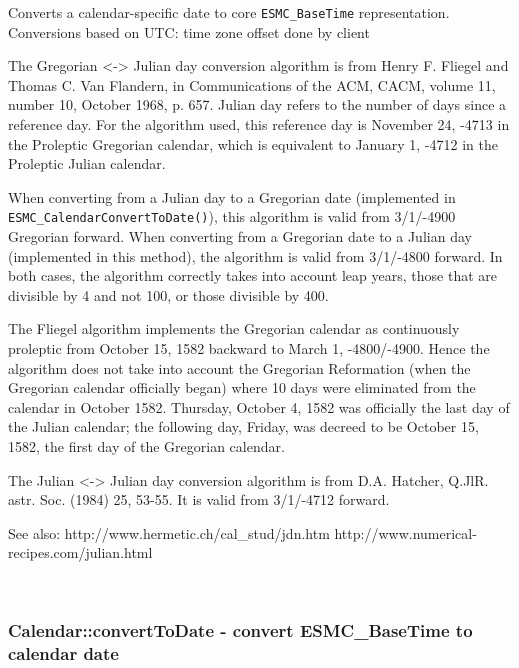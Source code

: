        Converts a calendar-specific date to core {\tt ESMC\_BaseTime}
       representation. Conversions based on UTC: time zone offset done by
       client
  
       The Gregorian <-> Julian day conversion algorithm is from
       Henry F. Fliegel and Thomas C. Van Flandern, in Communications of
       the ACM, CACM, volume 11, number 10, October 1968, p. 657.
       Julian day refers to the number of days since a reference day.
       For the algorithm used, this reference day is November 24, -4713
       in the Proleptic Gregorian calendar, which is equivalent to
       January 1, -4712 in the Proleptic Julian calendar.
   
       When converting from a Julian day to a Gregorian date (implemented
       in {\tt ESMC\_CalendarConvertToDate()}), this algorithm is valid from
       3/1/-4900 Gregorian forward.  When converting from a Gregorian date to
       a Julian day (implemented in this method), the algorithm is valid from
       3/1/-4800 forward.  In both cases, the algorithm correctly takes into
       account leap years, those that are divisible by 4 and not 100, or those
       divisible by 400.
  
       The Fliegel algorithm implements the Gregorian calendar as continuously
       proleptic from October 15, 1582 backward to March 1, -4800/-4900.
       Hence the algorithm does not take into account the Gregorian Reformation
       (when the Gregorian calendar officially began) where 10 days were
       eliminated from the calendar in October 1582.  Thursday, October 4, 1582
       was officially the last day of the Julian calendar; the following day,
       Friday, was decreed to be October 15, 1582, the first day of the
       Gregorian calendar.
  
       The Julian <-> Julian day conversion algorithm is from D.A. Hatcher,
       Q.JlR. astr. Soc. (1984) 25, 53-55.  It is valid from 3/1/-4712 forward.
  
       See also:  http://www.hermetic.ch/cal\_stud/jdn.htm
                  http://www.numerical-recipes.com/julian.html
   
 
\mbox{}\hrulefill\ 
 
\subsubsection [Calendar::convertToDate] {Calendar::convertToDate - convert ESMC\_BaseTime to calendar date}


